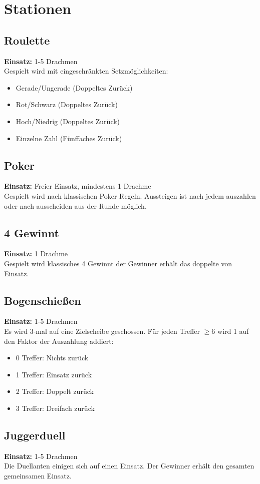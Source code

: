 \documentclass[11pt]{scrartcl}
\begin{document}
\section{Stationen}
\subsection{Roulette}
\textbf{Einsatz:} 1-5 Drachmen\\
Gespielt wird mit eingeschränkten Setzmöglichkeiten:\begin{itemize}
    \item Gerade/Ungerade (Doppeltes Zurück)
    \item Rot/Schwarz (Doppeltes Zurück)
    \item Hoch/Niedrig (Doppeltes Zurück)
    \item Einzelne Zahl (Fünffaches Zurück)
\end{itemize}
\subsection{Poker}
\textbf{Einsatz:} Freier Einsatz, mindestens 1 Drachme\\
Gespielt wird nach klassischen Poker Regeln. Aussteigen ist nach jedem auszahlen oder nach ausscheiden aus der Runde möglich.
\subsection{4 Gewinnt}
\textbf{Einsatz:} 1 Drachme\\
Gespielt wird klassisches 4 Gewinnt der Gewinner erhält das doppelte von Einsatz.
\subsection{Bogenschießen}
\textbf{Einsatz:} 1-5 Drachmen\\
Es wird 3-mal auf eine Zielscheibe geschossen. Für jeden Treffer $\geq 6$ wird 1 auf den Faktor der Auszahlung addiert:
\begin{itemize}
    \item 0 Treffer: Nichts zurück
    \item 1 Treffer: Einsatz zurück
    \item 2 Treffer: Doppelt zurück
    \item 3 Treffer: Dreifach zurück
\end{itemize}
\subsection{Juggerduell}
\textbf{Einsatz:} 1-5 Drachmen\\
Die Duellanten einigen sich auf einen Einsatz. Der Gewinner erhält den gesamten gemeinsamen Einsatz.
\end{document}
